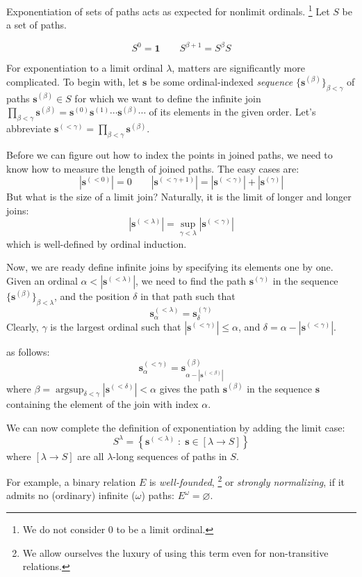\documentclass{llncs}
\newcommand{\One}{\textbf{1}}
\newcommand{\q}[2]{{\mathbf{#1}}^{(#2)}}
\newcommand{\ql}[2]{\prod_{\beta<#2}\q{#1}{\beta}}
\begin{document}
Exponentiation of sets of paths acts as expected for nonlimit ordinals.%
\footnote{We do not consider 0 to be a limit ordinal.}
Let $S$ be a set of paths.%

\[
S^0 = \One\qquad
S^{\beta+1} = S^\beta S
\]

For exponentiation to a limit ordinal $\lambda$, matters are significantly more complicated.
To begin with,
let $\mathbf{s}$ be some ordinal-indexed \emph{sequence} $\{\q{s}{\beta}\}_{\beta<\gamma}$  of paths $\q{s}{\beta}\in S$
for which we want to define the infinite join $\prod_{\beta<\gamma} \q{s}{\beta}= \q{s}0 \q{s}1 \cdots \q{s}\beta \cdots$ of its elements in the given order.
Let's abbreviate $\q{s}{<\gamma}=\ql{s}{\gamma}$.

Before we can figure out how to index the points in joined paths, we need to know how to measure the 
length of joined paths.
The easy cases are:
\[
\left| \q{s}{<0} \right| = 0 \qquad
\left| \q{s}{<\gamma+1} \right| = \left|  \q{s}{<\gamma} \right| + \left| \q{s}{\gamma} \right|
\]
%
But what is the size of a limit join? Naturally, it is the limit of longer and longer joins:
\[
\left| \q{s}{<\lambda} \right| = \sup_{\gamma<\lambda} \left| \q{s}{<\gamma}  \right| 
\]
which is well-defined by ordinal induction.

Now, we are ready define infinite joins by specifying its elements one
by one.  Given an ordinal $\alpha < | \q{s}{<\lambda}|$, we need to
find the path $\q{s}{\gamma}$ in the sequence
$\{\q{s}{\beta}\}_{\beta<\lambda}$, and the position $\delta$ in that
path such that
\[
\q{s}{<\lambda}_\alpha = \q{s}{\gamma}_{\delta}
\]
Clearly, $\gamma$ is the largest ordinal such that $ |\q{s}{<\gamma}|
\leq \alpha$, and $\delta= \alpha - |\q{s}{<\gamma}|$.

\begin{ignore} as
  follows:
\[
\q{s}{<\gamma}_\alpha =
\q{s}{\beta}_{\alpha - |\q{s}{<\beta}|}
\]
where $\beta = \mathop{\mathrm{argsup}}_{\delta<\gamma} |\q{s}{<\delta}| < \alpha$
gives the path $\q{s}{\beta}$ in the sequence $\mathbf{s}$ 
containing the element of the join with index $\alpha$.
\end{ignore}

We can now  complete the definition of exponentiation by adding the limit case:
\[
S^\lambda = \left\{\q{s}{<\lambda}  \;\colon\; \mathbf{s} \in [\lambda\rightarrow S]\right\}
\]
where $ [\lambda\rightarrow S]$ are all $\lambda$-long sequences of paths in $S$.

For example, a binary relation $E$ is \emph{well-founded},%
\footnote{We allow ourselves the luxury of using this term even for non-transitive relations.}
 or \emph{strongly normalizing}, if
it admits no (ordinary) infinite ($\omega$) paths:
$E^\omega = \varnothing$.
\end{document}
